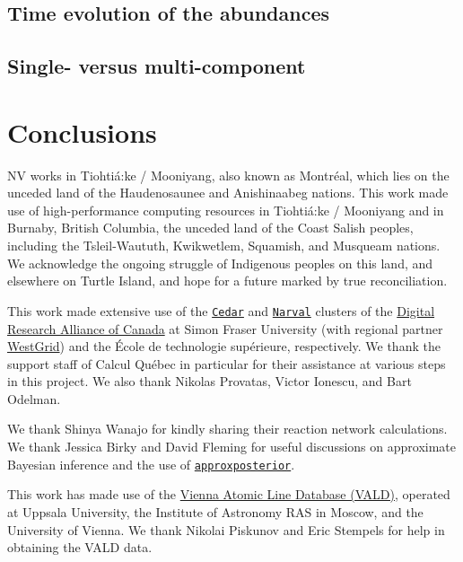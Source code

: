 \documentclass[twocolumn, twocolappendix]{aastex63}
\def\approxposterior{\texttt{approxposterior}}
\begin{document}
\subsection{Time evolution of the abundances}

\subsection{Single- versus multi-component}



\section{Conclusions}\label{sec:conclusions}



\acknowledgments


NV works in Tiohti{\'a}:ke / Mooniyang, also known as Montr{\'e}al, which lies on the unceded land of the Haudenosaunee and Anishinaabeg nations. This work made use of high-performance computing resources in Tiohti{\'a}:ke / Mooniyang and in Burnaby, British Columbia, the unceded land of the Coast Salish peoples, including the Tsleil-Waututh, Kwikwetlem, Squamish, and Musqueam nations. We acknowledge the ongoing struggle of Indigenous peoples on this land, and elsewhere on Turtle Island, and hope for a future marked by true reconciliation. 

This work made extensive use of the \href{https://docs.alliancecan.ca/wiki/Cedar}{\texttt{Cedar}} and \href{https://docs.alliancecan.ca/wiki/Narval/en}{\texttt{Narval}} clusters of the \href{https://alliancecan.ca/en}{Digital Research Alliance of Canada} at Simon Fraser University (with regional partner \href{https://www.westgrid.ca/}{WestGrid}) and the {\'E}cole de technologie sup{\'e}rieure, respectively. We thank the support staff of Calcul Qu{\'e}bec in particular for their assistance at various steps in this project. We also thank Nikolas Provatas, Victor Ionescu, and Bart Odelman.

We thank Shinya Wanajo for kindly sharing their reaction network calculations. We thank Jessica Birky and David Fleming for useful discussions on approximate Bayesian inference and the use of \href{https://dflemin3.github.io/approxposterior/index.html}{\approxposterior}.

This work has made use of the \href{http://vald.astro.uu.se/~vald/php/vald.php}{Vienna Atomic Line Database (VALD)}, operated at Uppsala University, the Institute of Astronomy RAS in Moscow, and the University of Vienna. We thank Nikolai Piskunov and Eric Stempels for help in obtaining the VALD data.
\end{document}
